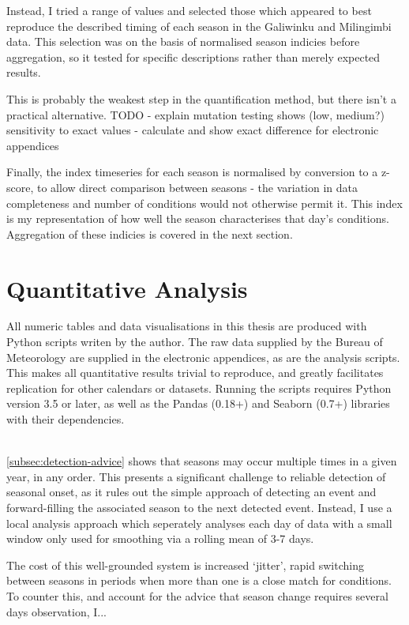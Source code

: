Instead, I tried a range of values and selected those which appeared to
best reproduce the described timing of each season in the Galiwinku and
Milingimbi data.  This selection was on the basis of normalised season
indicies before aggregation, so it tested for specific descriptions
rather than merely expected results.

This is probably the weakest step in the quantification method,
but there isn't a practical alternative.  TODO - explain mutation
testing shows (low, medium?) sensitivity to exact values -
calculate and show exact difference for electronic appendices

Finally, the index timeseries for each season is normalised by conversion to
a z-score, to allow direct comparison between seasons - the variation in data
completeness and number of conditions would not otherwise permit it.
This index is my representation of how well the season characterises that day's
conditions.  Aggregation of these indicies is covered in the next section.



\section{Quantitative Analysis}

All numeric tables and data visualisations in this thesis are produced
with Python scripts writen by the author.  The raw data supplied by the
Bureau of Meteorology are supplied in the electronic appendices, as
are the analysis scripts.  This makes all quantitative results trivial
to reproduce, and greatly facilitates replication for other calendars
or datasets.  Running the scripts requires Python version 3.5 or later,
as well as the Pandas (0.18+) and Seaborn (0.7+) libraries with their
dependencies.

~\\

\autoref{subsec:detection-advice} shows that seasons may occur multiple
times in a given year, in any order.  This presents a significant
challenge to reliable detection of seasonal onset, as it rules out
the simple approach of detecting an event and forward-filling the
associated season to the next detected event.  Instead, I use a local
analysis approach which seperately analyses each day of data with
a small window only used for smoothing via a rolling mean of 3-7 days.

The cost of this well-grounded system is increased `jitter', rapid
switching between seasons in periods when more than one is a close
match for conditions.  To counter this, and account for the advice
that season change requires several days observation, I...\\

